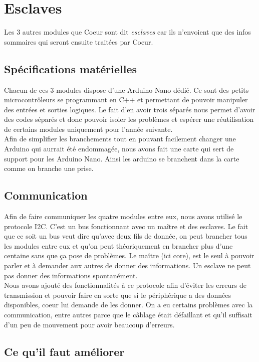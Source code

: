 \chapter{Esclaves}

Les 3 autres modules que Coeur sont dit \textit{esclaves} car ils n'envoient que des infos sommaires qui seront ensuite traitées par Coeur.

\section{Spécifications matérielles}
Chacun de ces 3 modules dispose d'une Arduino Nano dédié. Ce sont des petits microcontrôleurs se programmant en C++ et permettant de pouvoir manipuler des entrées et sorties logiques. Le fait d'en avoir trois séparés nous permet d'avoir des codes séparés et donc pouvoir isoler les problèmes et espérer une réutilisation de certains modules uniquement pour l'année suivante.\\

Afin de simplifier les branchements tout en pouvant facilement changer une Arduino qui aurrait été endommagée, nous avons fait une carte qui sert de support pour les Arduino Nano. Ainsi les arduino se branchent dans la carte comme on branche une prise.

\section{Communication}
Afin de faire communiquer les quatre modules entre eux, nous avons utilisé le protocole I2C. C'est un bus fonctionnant avec un maître et des esclaves. Le fait que ce soit un bus veut dire qu'avec deux fils de donnée, on peut brancher tous les modules entre eux et qu'on peut théoriquement en brancher plus d'une centaine sans que ça pose de problèmes. Le maître (ici core), est le seul à pouvoir parler et à demander aux autres de donner des informations. Un esclave ne peut pas donner des informations spontanément.\\

Nous avons ajouté des fonctionnalités à ce protocole afin d'éviter les erreurs de transmission et pouvoir faire en sorte que si le périphérique a des données disponibles, coeur lui demande de les donner. On a eu certains problèmes avec la communication, entre autres parce que le câblage était défaillant et qu'il suffisait d'un peu de mouvement pour avoir beaucoup d'erreurs.

\newpage
\section{Ce qu'il faut améliorer}
